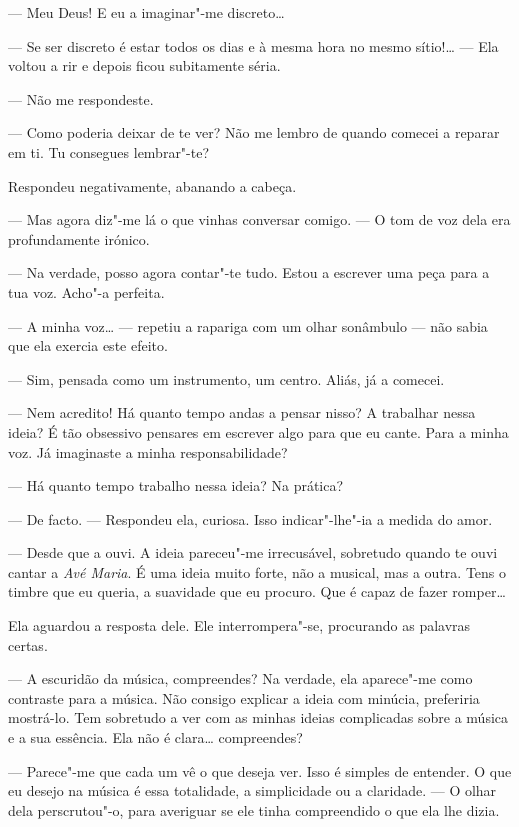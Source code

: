 --- Meu Deus! E eu a imaginar"-me discreto\ldots{}

--- Se ser discreto é estar todos os dias e à mesma hora no mesmo
sítio!\ldots{} --- Ela voltou a rir e depois ficou subitamente séria.

--- Não me respondeste.

--- Como poderia deixar de te ver? Não me lembro de quando comecei a
reparar em ti. Tu consegues lembrar"-te?

Respondeu negativamente, abanando a cabeça.

--- Mas agora diz"-me lá o que vinhas conversar comigo. --- O tom de voz dela
era profundamente irónico.

--- Na verdade, posso agora contar"-te tudo. Estou a escrever uma peça para
a tua voz. Acho"-a perfeita.

--- A minha voz\ldots{} --- repetiu a rapariga com um olhar sonâmbulo --- não sabia
que ela exercia este efeito.

--- Sim, pensada como um instrumento, um centro. Aliás, já a comecei.

--- Nem acredito! Há quanto tempo andas a pensar nisso? A trabalhar nessa
ideia? É tão obsessivo pensares em escrever algo para que eu cante. Para
a minha voz. Já imaginaste a minha responsabilidade?

--- Há quanto tempo trabalho nessa ideia? Na prática?

--- De facto. --- Respondeu ela, curiosa. Isso indicar"-lhe"-ia a medida do
amor.

--- Desde que a ouvi. A ideia pareceu"-me irrecusável, sobretudo quando te
ouvi cantar a \emph{Avé Maria}. É uma ideia muito forte, não a musical,
mas a outra. Tens o timbre que eu queria, a suavidade que eu procuro.
Que é capaz de fazer romper\ldots{}

Ela aguardou a resposta dele. Ele interrompera"-se, procurando as
palavras certas.

--- A escuridão da música, compreendes? Na verdade, ela aparece"-me como
contraste para a música. Não consigo explicar a ideia com minúcia,
preferiria mostrá-lo. Tem sobretudo a ver com as minhas ideias
complicadas sobre a música e a sua essência. Ela não é
clara\ldots{} compreendes?

--- Parece"-me que cada um vê o que deseja ver. Isso é simples de entender.
O que eu desejo na música é essa totalidade, a simplicidade ou a
claridade. --- O olhar dela perscrutou"-o, para averiguar se ele tinha
compreendido o que ela lhe dizia.

